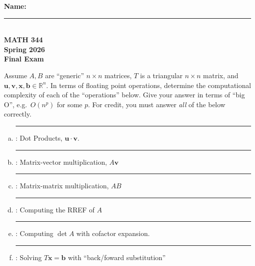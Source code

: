 \documentclass[12pt,letterpaper]{exam}
\begin{document}
\noindent \textbf{Name:} \rule{3in}{0.4pt} \vspace{1em} \\[-0.3cm]
\noindent \textbf{MATH 344} \\
\noindent \textbf{Spring 2026} \\
\noindent \textbf{Final Exam} \par \vspace{1em}

\noindent Assume $A, B$ are ``generic'' $n \times n$ matrices, $T$ is a triangular $n \times n$ matrix, and $\mathbf{u}, \mathbf{v}, \mathbf{x}, \mathbf{b} \in \mathbb{R}^n$. In terms of floating point operations, determine the computational complexity of each of the ``operations'' below. Give your answer in terms of ``big O'', e.g.\ $O(n^p)$ for some $p$. For credit, you must answer \textit{all} of the below correctly. \par\vspace{0.3cm}

\begin{enumerate}[(a)]
\item \rule{1in}{0.4pt} : \quad Dot Products, $\mathbf{u} \cdot \mathbf{v}$. \vspace{2em}

\item \rule{1in}{0.4pt} : \quad Matrix-vector multiplication, $A\mathbf{v}$ \vspace{2em}

\item \rule{1in}{0.4pt} : \quad Matrix-matrix multiplication, $AB$ \vspace{2em}

\item \rule{1in}{0.4pt} : \quad Computing the RREF of $A$ \vspace{2em}

\item \rule{1in}{0.4pt} : \quad Computing $\det A$ with cofactor expansion. \vspace{2em}

\item \rule{1in}{0.4pt} : \quad Solving $T\mathbf{x} = \mathbf{b}$ with ``back/foward substitution'' \vspace{2em}
\end{enumerate}
\end{document}
